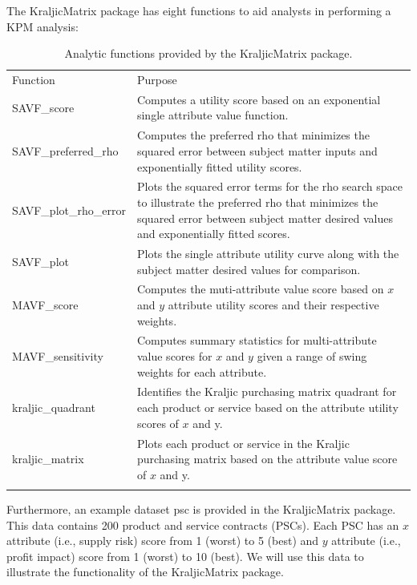 \documentclass[twocolumn]{svjour3}       %
\begin{document}
The KraljicMatrix package has eight functions to aid analysts in performing a KPM analysis:
\begin{table}[!htb]
  \centering
  \caption{Analytic functions provided by the KraljicMatrix package.}
  \label{tab:1}       %
  \begin{tabular}{lp{10cm}}
    \hline\noalign{\smallskip}
    Function & Purpose  \\
    \noalign{\smallskip}\hline\noalign{\smallskip}
    SAVF\_score & Computes a utility score based on an exponential single attribute value function. \\
    SAVF\_preferred\_rho & Computes the preferred rho that minimizes the squared error between subject matter inputs and exponentially fitted utility scores. \\
    SAVF\_plot\_rho\_error & Plots the squared error terms for the rho search space to illustrate the preferred rho that minimizes the squared error between subject matter desired values and exponentially fitted scores. \\
    SAVF\_plot & Plots the single attribute utility curve along with the subject matter desired values for comparison. \\
    MAVF\_score & Computes the muti-attribute value score based on $x$ and $y$ attribute utility scores and their respective weights. \\
    MAVF\_sensitivity & Computes summary statistics for multi-attribute value scores for $x$ and $y$ given a range of swing weights for each attribute. \\
    kraljic\_quadrant & Identifies the Kraljic purchasing matrix quadrant for each product or service based on the attribute utility scores of $x$ and y. \\
    kraljic\_matrix & Plots each product or service in the Kraljic purchasing matrix based on the attribute value score of $x$ and y. \\
    \noalign{\smallskip}\hline
  \end{tabular}
\end{table}

Furthermore, an example dataset psc is provided in the KraljicMatrix package. This data contains 200 product and service contracts (PSCs). Each PSC has an $x$ attribute (i.e., supply risk) score from 1 (worst) to 5 (best) and $y$ attribute (i.e., profit impact) score from 1 (worst) to 10 (best).  We will use this data to illustrate the functionality of the KraljicMatrix package.
\end{document}
